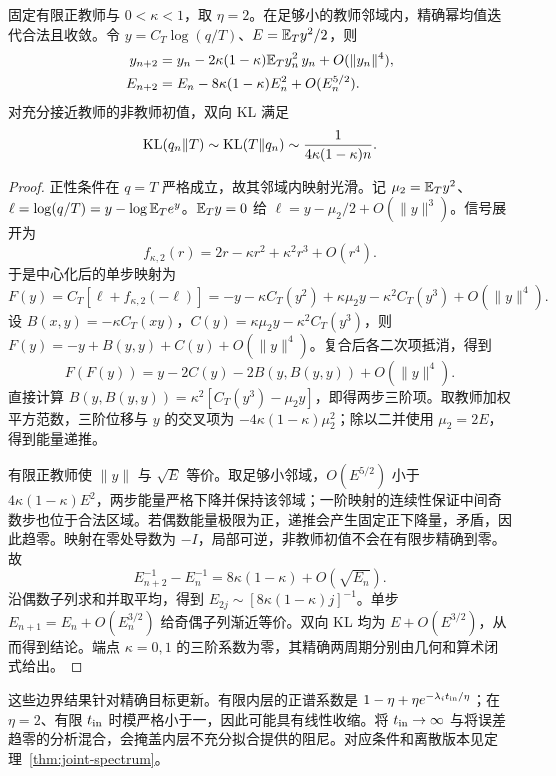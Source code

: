 \begin{theorem}[幂均值在 $\eta=2$ 的两步展开]
\label{thm:power-boundary-rate}
固定有限正教师与 $0<\kappa<1$，取 $\eta=2$。在足够小的教师邻域内，精确幂均值迭代合法且收敛。令 $y=C_T\log(q/T)$、$E=\mathbb E_Ty^2/2$，则
\begin{align}
y_{n+2}&=y_n-2\kappa(1-\kappa)\mathbb E_Ty_n^2\,y_n+O(\|y_n\|^4),\\
E_{n+2}&=E_n-8\kappa(1-\kappa)E_n^2+O(E_n^{5/2}).
\end{align}
对充分接近教师的非教师初值，双向 KL 满足
\begin{equation}
\operatorname{KL}(q_n\Vert T)\sim\operatorname{KL}(T\Vert q_n)
\sim\frac1{4\kappa(1-\kappa)n}.
\end{equation}
\end{theorem}
\begin{proof}
正性条件在 $q=T$ 严格成立，故其邻域内映射光滑。记 $\mu_2=\mathbb E_Ty^2$、$\ell=\log(q/T)=y-\log\mathbb E_Te^y$。$\mathbb E_Ty=0$ 给 $\ell=y-\mu_2/2+O(\|y\|^3)$。信号展开为
\begin{equation}
f_{\kappa,2}(r)=2r-\kappa r^2+\kappa^2r^3+O(r^4).
\end{equation}
于是中心化后的单步映射为
\begin{equation}
F(y)=C_T[\ell+f_{\kappa,2}(-\ell)]
=-y-\kappa C_T(y^2)+\kappa\mu_2y-\kappa^2C_T(y^3)+O(\|y\|^4).
\end{equation}
设 $B(x,y)=-\kappa C_T(xy)$，$C(y)=\kappa\mu_2y-\kappa^2C_T(y^3)$，则 $F(y)=-y+B(y,y)+C(y)+O(\|y\|^4)$。复合后各二次项抵消，得到
\begin{equation}
F(F(y))=y-2C(y)-2B(y,B(y,y))+O(\|y\|^4).
\end{equation}
直接计算 $B(y,B(y,y))=\kappa^2[C_T(y^3)-\mu_2y]$，即得两步三阶项。取教师加权平方范数，三阶位移与 $y$ 的交叉项为 $-4\kappa(1-\kappa)\mu_2^2$；除以二并使用 $\mu_2=2E$，得到能量递推。

有限正教师使 $\|y\|$ 与 $\sqrt E$ 等价。取足够小邻域，$O(E^{5/2})$ 小于 $4\kappa(1-\kappa)E^2$，两步能量严格下降并保持该邻域；一阶映射的连续性保证中间奇数步也位于合法区域。若偶数能量极限为正，递推会产生固定正下降量，矛盾，因此趋零。映射在零处导数为 $-I$，局部可逆，非教师初值不会在有限步精确到零。故
\begin{equation}
E_{n+2}^{-1}-E_n^{-1}=8\kappa(1-\kappa)+O(\sqrt{E_n}).
\end{equation}
沿偶数子列求和并取平均，得到 $E_{2j}\sim[8\kappa(1-\kappa)j]^{-1}$。单步 $E_{n+1}=E_n+O(E_n^{3/2})$ 给奇偶子列渐近等价。双向 KL 均为 $E+O(E^{3/2})$，从而得到结论。端点 $\kappa=0,1$ 的三阶系数为零，其精确两周期分别由几何和算术闭式给出。
\end{proof}

这些边界结果针对精确目标更新。有限内层的正谱系数是 $1-\eta+\eta e^{-\lambda_i t_{\rm in}/\eta}$；在 $\eta=2$、有限 $t_{\rm in}$ 时模严格小于一，因此可能具有线性收缩。将 $t_{\rm in}\to\infty$ 与将误差趋零的分析混合，会掩盖内层不充分拟合提供的阻尼。对应条件和离散版本见定理~\ref{thm:joint-spectrum}。
